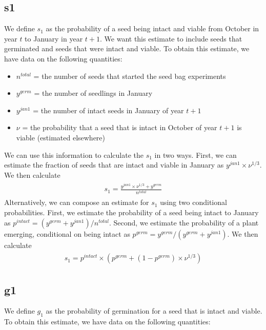 \documentclass[12pt, oneside]{article}   	%
\begin{document}
\subsection*{s1}

We define $s_1$ as the probability of a seed being intact and viable from October in year $t$ to January in year $t+1$. We want this estimate to include seeds that germinated and seeds that were intact and viable. To obtain this estimate, we have data on the following quantities:

\begin{itemize}
	\item $n^{total}$ = the number of seeds that started the seed bag experiments
	\item $y^{germ}$ = the number of seedlings in January
	\item $y^{jan1}$ = the number of intact seeds in January of year $t+1$
	\item $\nu$ = the probability that a seed that is intact in October of year $t+1$ is viable (estimated elsewhere)
\end{itemize}

We can use this information to calculate the $s_1$ in two ways. First, we can estimate the fraction of seeds that are intact and viable in January as $y^{jan1}\times \nu^{1/3}$. We then calculate 
%
    \begin{align}
\begin{split}
s_1 = \frac{y^{jan1}\times \nu^{1/3} + y^{germ}}{n^{total}}
  \end{split}
\end{align}
%
Alternatively, we can compose an estimate for $s_1$ using two conditional probabilities. First, we estimate the probability of a seed being intact to January as $p^{intact} = (y^{germ}+y^{jan1})/n^{total}$. Second, we estimate the probability of a plant emerging, conditional on being intact as $p^{germ} = y^{germ}/(y^{germ}+y^{jan1})$. We then calculate 
%
    \begin{align}
\begin{split}
s_1 = p^{intact} \times (p^{germ} + ( 1- p^{germ} ) \times \nu^{1/3} )
  \end{split}
\end{align}
%

\subsection*{g1}

We define $g_1$ as the probability of germination for a seed that is intact and viable. To obtain this estimate, we have data on the following quantities:
\end{document}
